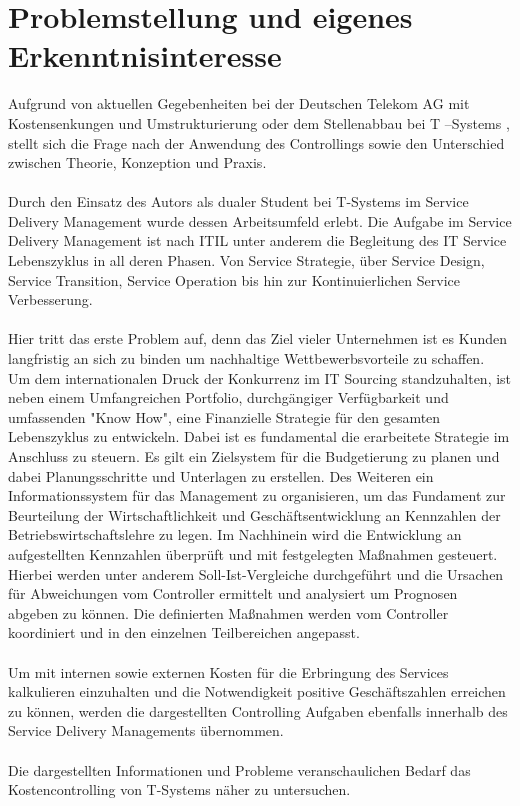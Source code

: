 

\chapter{Problemstellung und eigenes Erkenntnisinteresse}
\label{ch:Problemstellung}

Aufgrund von aktuellen Gegebenheiten bei der Deutschen Telekom AG mit Kostensenkungen und Umstrukturierung oder dem Stellenabbau bei T –Systems \cite{web:Handelsblatt}, stellt sich die Frage nach der Anwendung des Controllings sowie den Unterschied zwischen Theorie, Konzeption und Praxis.
\\
\\
Durch den Einsatz des Autors als dualer Student bei T-Systems im Service Delivery Management wurde dessen Arbeitsumfeld erlebt.
Die Aufgabe im Service Delivery Management ist nach ITIL unter anderem die Begleitung des IT Service Lebenszyklus \cite{web:LiveCylce} in all deren Phasen.
Von Service Strategie, über Service Design, Service Transition, Service Operation bis hin zur Kontinuierlichen Service Verbesserung.
\\
\\
Hier tritt das erste Problem auf, denn das Ziel vieler Unternehmen ist es Kunden langfristig an sich zu binden um nachhaltige Wettbewerbsvorteile zu schaffen. 
\\
Um dem internationalen Druck der Konkurrenz im IT Sourcing standzuhalten, ist neben einem Umfangreichen Portfolio, durchgängiger Verfügbarkeit und umfassenden "Know How", eine Finanzielle Strategie für den gesamten Lebenszyklus zu entwickeln.
Dabei ist es fundamental die erarbeitete Strategie im Anschluss zu steuern.
Es gilt ein Zielsystem für die Budgetierung zu planen und dabei Planungsschritte und Unterlagen zu erstellen.
Des Weiteren ein Informationssystem für das Management zu organisieren, um das Fundament zur Beurteilung der Wirtschaftlichkeit und Geschäftsentwicklung an Kennzahlen der Betriebswirtschaftslehre zu legen.
Im Nachhinein wird die Entwicklung an aufgestellten Kennzahlen überprüft und mit festgelegten Maßnahmen gesteuert.
Hierbei werden unter anderem Soll-Ist-Vergleiche durchgeführt und die Ursachen für Abweichungen vom Controller ermittelt und analysiert um Prognosen abgeben zu können.
Die definierten Maßnahmen werden vom Controller koordiniert und in den einzelnen Teilbereichen angepasst.
\\
\\
Um mit internen sowie externen Kosten für die Erbringung des Services kalkulieren einzuhalten und die Notwendigkeit positive Geschäftszahlen erreichen zu können, werden die dargestellten Controlling \cite{web:Controlling} Aufgaben ebenfalls innerhalb des Service Delivery Managements übernommen.
\\
\\
Die dargestellten Informationen und Probleme veranschaulichen Bedarf das Kostencontrolling von T-Systems näher zu untersuchen.




